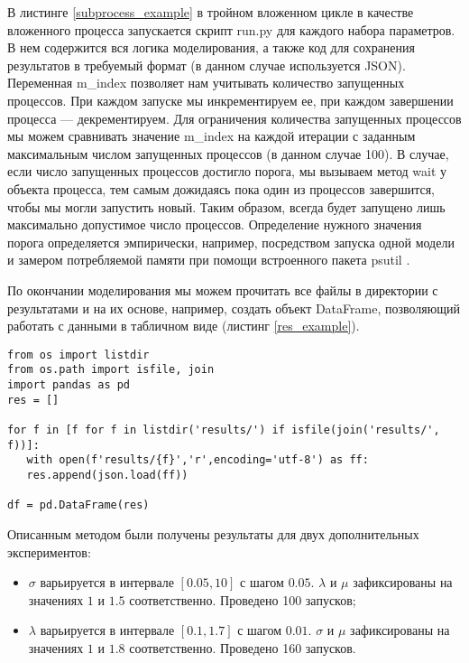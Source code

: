 В листинге \ref{subprocess_example} в тройном вложенном цикле в качестве вложенного процесса запускается скрипт run.py для каждого набора параметров. В нем содержится вся логика моделирования, а также код для сохранения результатов в требуемый формат (в данном случае используется JSON). Переменная m\_index позволяет нам учитывать количество запущенных процессов. При каждом запуске мы инкрементируем ее, при каждом завершении процесса --- декрементируем. Для ограничения количества запущенных процессов мы можем сравнивать значение m\_index на каждой итерации с заданным максимальным числом запущенных процессов (в данном случае 100). В случае, если число запущенных процессов достигло порога, мы вызываем метод wait у объекта процесса, тем самым дожидаясь пока один из процессов завершится, чтобы мы могли запустить новый. Таким образом, всегда будет запущено лишь максимально допустимое число процессов. Определение нужного значения порога определяется эмпирически, например, посредством запуска одной модели и замером потребляемой памяти при помощи встроенного пакета psutil \cite{psutil}.

По окончании моделирования мы можем прочитать все файлы в директории с результатами и на их основе, например, создать объект DataFrame, позволяющий работать с данными в табличном виде (листинг \ref{res_example}).

\begin{lstlisting}
from os import listdir
from os.path import isfile, join
import pandas as pd
res = []

for f in [f for f in listdir('results/') if isfile(join('results/', f))]:
   with open(f'results/{f}','r',encoding='utf-8') as ff:
   res.append(json.load(ff))

df = pd.DataFrame(res)
\end{lstlisting}

Описанным методом были получены результаты для двух дополнительных экспериментов:
\begin{itemize}
	\item $\sigma$ варьируется в интервале $[0.05,10]$ с шагом $0.05$. $\lambda$ и $\mu$ зафиксированы на значениях $1$ и $1.5$ соответственно. Проведено 100 запусков;
	\item $\lambda$ варьируется в интервале $[0.1,1.7]$ с шагом $0.01$. $\sigma$ и $\mu$ зафиксированы на значениях $1$ и $1.8$ соответственно. Проведено 160 запусков.
\end{itemize}

